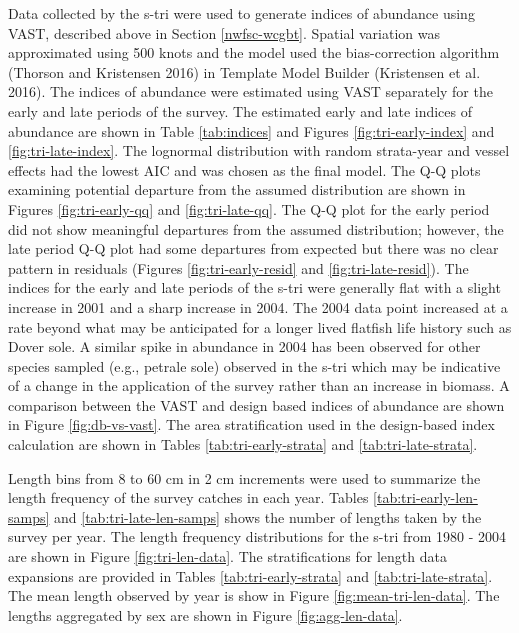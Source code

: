 \documentclass[11pt,
  english,
  a4paper,
]{article}
\begin{document}
Data collected by the \gls{s-tri} were used to generate indices of abundance using VAST, described above in Section \ref{nwfsc-wcgbt}. Spatial variation was approximated using 500 knots and the model used the bias-correction algorithm {(Thorson and Kristensen 2016)\leavevmode\tagmcend\tagstructend} in Template Model Builder {(Kristensen et al. 2016)\leavevmode\tagmcend\tagstructend}. The indices of abundance were estimated using VAST separately for the early and late periods of the survey. The estimated early and late indices of abundance are shown in Table \ref{tab:indices} and Figures \ref{fig:tri-early-index} and \ref{fig:tri-late-index}. The lognormal distribution with random strata-year and vessel effects had the lowest AIC and was chosen as the final model. The Q-Q plots examining potential departure from the assumed distribution are shown in Figures \ref{fig:tri-early-qq} and \ref{fig:tri-late-qq}. The Q-Q plot for the early period did not show meaningful departures from the assumed distribution; however, the late period Q-Q plot had some departures from expected but there was no clear pattern in residuals (Figures \ref{fig:tri-early-resid} and \ref{fig:tri-late-resid}). The indices for the early and late periods of the \gls{s-tri} were generally flat with a slight increase in 2001 and a sharp increase in 2004. The 2004 data point increased at a rate beyond what may be anticipated for a longer lived flatfish life history such as Dover sole. A similar spike in abundance in 2004 has been observed for other species sampled (e.g., petrale sole) observed in the \gls{s-tri} which may be indicative of a change in the application of the survey rather than an increase in biomass. A comparison between the VAST and design based indices of abundance are shown in Figure \ref{fig:db-vs-vast}. The area stratification used in the design-based index calculation are shown in Tables \ref{tab:tri-early-strata} and \ref{tab:tri-late-strata}.

\leavevmode\tagmcend\tagstructend\par


Length bins from 8 to 60 cm in 2 cm increments were used to summarize the length frequency of the survey catches in each year. Tables \ref{tab:tri-early-len-samps} and \ref{tab:tri-late-len-samps} shows the number of lengths taken by the survey per year. The length frequency distributions for the \gls{s-tri} from 1980 - 2004 are shown in Figure \ref{fig:tri-len-data}. The stratifications for length data expansions are provided in Tables \ref{tab:tri-early-strata} and \ref{tab:tri-late-strata}. The mean length observed by year is show in Figure \ref{fig:mean-tri-len-data}. The lengths aggregated by sex are shown in Figure \ref{fig:agg-len-data}.
\end{document}
